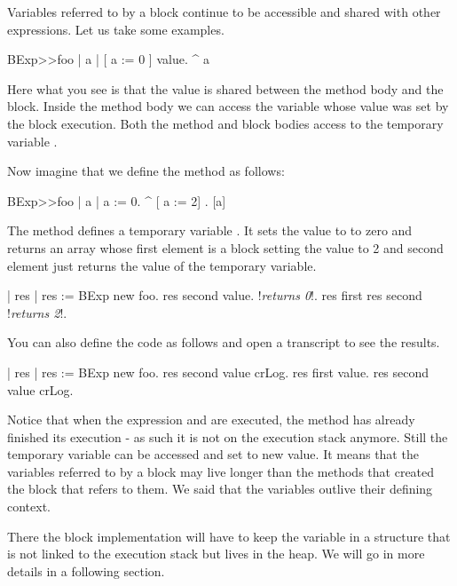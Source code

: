 \documentclass[a4paper,10pt,twoside]{book}
\begin{document}
Variables referred to by a block continue to be accessible and shared with other expressions. Let us 
take some examples. 

\begin{code}{}
BExp>>foo
	| a |
	[ a := 0 ] value.
	^ a
\end{code}

Here what you see is that the value is shared between the method body and the block. Inside the method body we can access the variable whose value was set by the block execution. 
Both the method  and block bodies access to the temporary variable .

Now imagine that we define the method  as follows:

\begin{code}{}
BExp>>foo
	| a |
	a := 0. 
	^ {[ a := 2] . [a]} 
\end{code}

The method  defines a temporary variable . It sets the value to 
to zero and returns an array whose first element is a block setting the value to 2 and second element just returns the value of the temporary variable. 

\begin{code}{}
| res | 
res := BExp new foo.
res second value.
     !\emph{returns 0}!. 
res first 
res second
     !\emph{returns 2}!. 
\end{code}

You can also define the code as follows and open a transcript to see the results.


\begin{code}
| res |
res := BExp new foo.
res second value crLog.
res first value.
res second value crLog.
\end{code}

Notice that when the expression  and  are executed, the method  has already finished its execution - as such it is not on the execution stack anymore.  Still the temporary variable  can be accessed and set to new value. It means that the variables referred to by a block may live longer than the methods that created the block that refers to them. We said that the variables outlive their defining context. 

There the block implementation will have to keep the variable in a structure that is not linked to the execution stack but lives in the heap. We will go in more details in a following section. 
\end{document}
